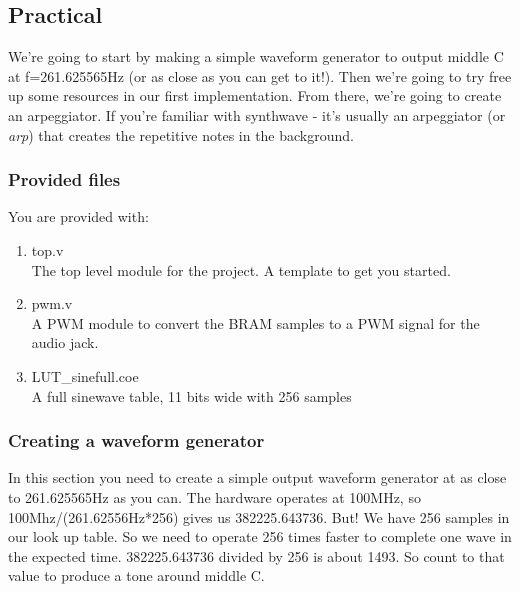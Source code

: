 \subsection{Practical}
We're going to start by making a simple waveform generator to output middle C at f=261.625565Hz (or as close as you can get to it!). Then we're going to try free up some resources in our first implementation. From there, we're going to create an arpeggiator. If you're familiar with synthwave - it's usually an arpeggiator (or \textit{arp}) that creates the repetitive notes in the background.

\subsubsection{Provided files}
You are provided with:
\begin{enumerate}
    \item top.v\\
    The top level module for the project. A template to get you started.
    \item pwm.v\\
    A PWM module to convert the BRAM samples to a PWM signal for the audio jack.
    \item LUT\_sinefull.coe\\
    A full sinewave table, 11 bits wide with 256 samples
\end{enumerate}

\subsubsection{Creating a waveform generator}
In this section you need to create a simple output waveform generator at as close to 261.625565Hz as you can. The hardware operates at 100MHz, so 100Mhz/(261.62556Hz*256) gives us 382225.643736. But! We have 256 samples in our look up table. So we need to operate 256 times faster to complete one wave in the expected time. 382225.643736 divided by 256 is about 1493. So count to that value to produce a tone around middle C.

